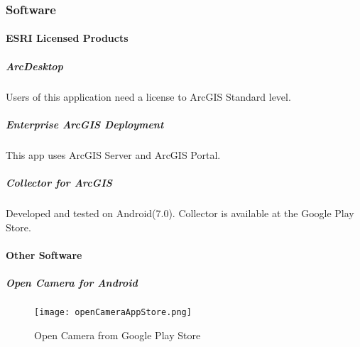 \documentclass[class=article , crop=false, titlepage, twoside, multi={itemize, figure, verbatim}, float=false]{standalone}
\begin{document}
\clearpage
\subsubsection{Software}
\paragraph{ESRI Licensed Products}
\subparagraph{ArcDesktop}Users of this application need a license to ArcGIS Standard level.

\subparagraph{Enterprise ArcGIS Deployment}This app uses ArcGIS Server and ArcGIS Portal.

\subparagraph{Collector for ArcGIS}Developed and tested on Android(7.0).  Collector is available at the Google Play Store.

\paragraph{Other Software}

\subparagraph{Open Camera for Android}

\begin{figure}[h!]
\centering
    \texttt{[image: openCameraAppStore.png]}
\caption{Open Camera from Google Play Store}
\end{figure}
\end{document}
